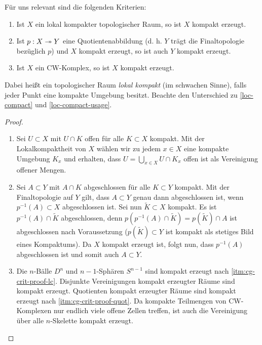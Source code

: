 Für uns relevant sind die folgenden Kriterien:
\begin{lemma} \label{cg-crit}
  \begin{enumerate}[label=(\roman*)]
    \item \label{itm:cg-crit-lc} Ist $X$ ein lokal kompakter
      topologischer Raum, so ist $X$ kompakt erzeugt.
    \item \label{itm:cg-crit-quot} Ist $p: X \twoheadrightarrow Y$ eine
      Quotientenabbildung (d. h. $Y$ trägt die Finaltopologie
      bezüglich $p$) und $X$ kompakt erzeugt, so ist auch $Y$ kompakt
      erzeugt.
     \item \label{itm:cg-crit-cw} Ist $X$ ein CW-Komplex, so ist $X$
       kompakt erzeugt.
  \end{enumerate}
\end{lemma}
Dabei heißt ein topologischer Raum \emph{lokal kompakt} (im schwachen
Sinne), falls jeder Punkt eine kompakte Umgebung besitzt. Beachte den
Unterschied zu \ref{loc-compact} und \ref{loc-compact-usage}.
\begin{proof}
  \begin{enumerate}[label=(\roman*)]
    \item \label{itm:cg-crit-proof-lc} Sei $U \subset X$ mit $U \cap
      K$ offen für alle $K \subset X$ kompakt. Mit der
      Lokalkompaktheit von $X$ wählen wir zu jedem $x \in X$ eine
      kompakte Umgebung $K_x$ und erhalten, dass $U = \bigcup_{x \in
        X} U \cap K_x$ offen ist als Vereinigung offener Mengen.
    \item \label{itm:cg-crit-proof-quot} Sei $A \subset Y$ mit $A \cap
      K$ abgeschlossen für alle $K \subset Y$ kompakt. Mit der
      Finaltopologie auf $Y$ gilt, dass $A \subset Y$ genau dann
      abgeschlossen ist, wenn $p^{-1}(A) \subset X$ abgeschlossen
      ist. Sei nun $\tilde{K} \subset X$ kompakt. Es ist $p^{-1}(A)
      \cap \tilde{K}$ abgeschlossen, denn $p(p^{-1}(A) \cap \tilde{K})
      = p(\tilde{K}) \cap A$ ist abgeschlossen nach Voraussetzung
      ($p(\tilde{K}) \subset Y$ ist kompakt als stetiges Bild eines
      Kompaktums). Da $X$ kompakt erzeugt ist, folgt nun, dass
      $p^{-1}(A)$ abgeschlossen ist und somit auch $A \subset Y$.
    \item Die $n$-Bälle $D^n$ und $n-1$-Sphären $S^{n-1}$ sind kompakt
      erzeugt nach \ref{itm:cg-crit-proof-lc}. Disjunkte Vereinigungen
      kompakt erzeugter Räume sind kompakt erzeugt. Quotienten kompakt
      erzeugter Räume sind kompakt erzeugt nach
      \ref{itm:cg-crit-proof-quot}. Da kompakte Teilmengen von
      CW-Komplexen nur endlich viele offene Zellen treffen, ist auch
      die Vereinigung über alle $n$-Skelette kompakt erzeugt.
  \end{enumerate}
\end{proof}

